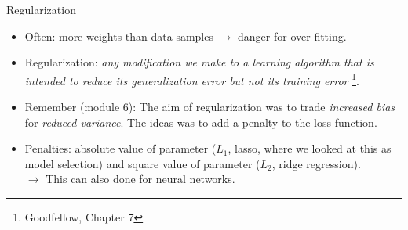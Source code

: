 \documentclass[
  10pt,
  ignorenonframetext,
]{beamer}
\providecommand{\tightlist}{%
  \setlength{\itemsep}{0pt}\setlength{\parskip}{0pt}}
\begin{document}
\begin{frame}
\begin{block}{Regularization}
\protect\hypertarget{regularization}{}
\(~\)

\begin{itemize}
\tightlist
\item
  Often: more weights than data samples \(\rightarrow\) danger for
  over-fitting.
\end{itemize}

\vspace{2mm}

\begin{itemize}
\tightlist
\item
  Regularization: \emph{any modification we make to a learning algorithm
  that is intended to reduce its generalization error but not its
  training error} \footnote{Goodfellow, Chapter 7}.
\end{itemize}

\vspace{2mm}

\begin{itemize}
\tightlist
\item
  Remember (module 6): The aim of regularization was to trade
  \emph{increased bias} for \emph{reduced variance}. The ideas was to
  add a penalty to the loss function.
\end{itemize}

\vspace{2mm}

\begin{itemize}
\tightlist
\item
  Penalties: absolute value of parameter (\(L_1\), lasso, where we
  looked at this as model selection) and square value of parameter
  (\(L_2\), ridge regression).\\
  \(\rightarrow\) This can also done for neural networks.
\end{itemize}
\end{block}
\end{frame}
\end{document}
